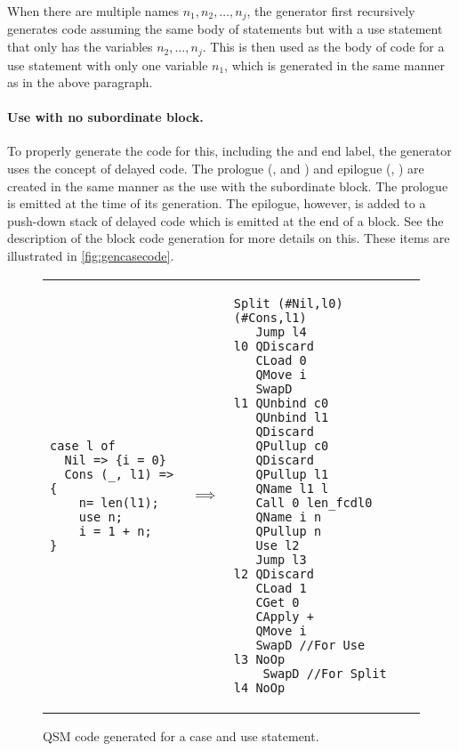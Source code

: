 When there are multiple names $n_1,n_2,\ldots,n_j$, the generator first
recursively generates code assuming the same body of 
statements but with a use statement that only has the variables 
$n_2,\ldots,n_j$. This is then used as the body of code for
a use statement with only one variable $n_1$, which is generated
in the same manner as in the above paragraph.

\paragraph{Use with no subordinate block.}
To properly generate the code for this, including the  and
end label, the generator uses
 the concept of delayed code. The prologue (,
 and ) and epilogue (, )
are created in the same manner as the use with the subordinate block.
The prologue is emitted at the time of its generation. The epilogue, however,
is added to a push-down stack of delayed code which is emitted at the
end of a block.  See the description of the block code generation for more
details on this. These items are illustrated in \vref{fig:gencasecode}.

\begin{figure}[htbp]
\begin{center}
\begin{tabular}{p{2in}p{.3in}p{2.5in}}
{\begin{singlespace}
\begin{lstlisting}[style=linqpl]
case l of
  Nil => {i = 0}
  Cons (_, l1) => {
    n= len(l1);
    use n;
    i = 1 + n;
}
\end{lstlisting}
\end{singlespace}}
 & { \qquad \qquad \quad \quad \qquad \qquad $\implies$} &
{\begin{singlespace}
\begin{lstlisting}[style=linqpl]
 Split (#Nil,l0) (#Cons,l1) 
   Jump l4
l0 QDiscard
   CLoad 0
   QMove i
   SwapD
l1 QUnbind c0
   QUnbind l1
   QDiscard
   QPullup c0
   QDiscard 
   QPullup l1
   QName l1 l
   Call 0 len_fcdl0
   QName i n
   QPullup n
   Use l2
   Jump l3
l2 QDiscard 
   CLoad 1
   CGet 0
   CApply +
   QMove i
   SwapD //For Use
l3 NoOp
    SwapD //For Split
l4 NoOp
\end{lstlisting}
\end{singlespace}}
\end{tabular}
\end{center}
\caption{QSM code generated for a case and use statement.}\label{fig:gencasecode}
\end{figure}



